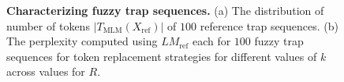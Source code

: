 \begin{figure}[ht]
\centering
{}
\caption{\textbf{Characterizing fuzzy trap sequences.} (a) The distribution of number of tokens $|T_{\text{MLM}}(X_{\text{ref}})|$ of $100$ reference trap sequences. (b) The perplexity computed using $\textit{LM}_{\text{ref}}$ each for $100$ fuzzy trap sequences for token replacement strategies for different values of $k$ across values for $R$.} 
\label{fig:tokens_ppl}
\end{figure}